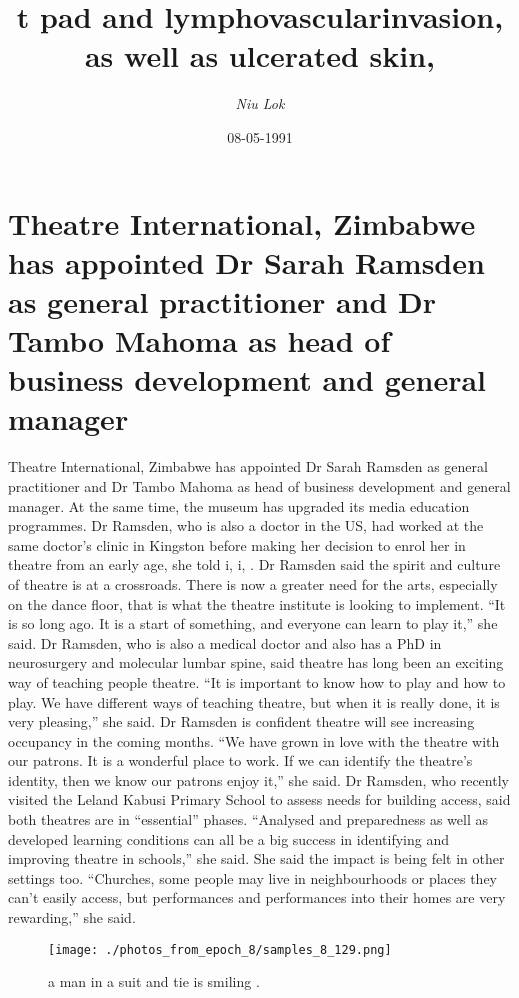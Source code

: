 \documentclass{article}%
\title{t pad and lymphovascularinvasion, as well as ulcerated skin,}%
\author{\textit{Niu Lok}}%
\date{08-05-1991}%
\begin{document}
%
\normalsize%
\maketitle%
\section{Theatre International, Zimbabwe has appointed Dr Sarah Ramsden as general practitioner and Dr Tambo Mahoma as head of business development and general manager}%
\label{sec:TheatreInternational,ZimbabwehasappointedDrSarahRamsdenasgeneralpractitionerandDrTamboMahomaasheadofbusinessdevelopmentandgeneralmanager}%
Theatre International, Zimbabwe has appointed Dr Sarah Ramsden as general practitioner and Dr Tambo Mahoma as head of business development and general manager.\newline%
At the same time, the museum has upgraded its media education programmes. Dr Ramsden, who is also a doctor in the US, had worked at the same doctor’s clinic in Kingston before making her decision to enrol her in theatre from an early age, she told i, i,  .\newline%
Dr Ramsden said the spirit and culture of theatre is at a crossroads. There is now a greater need for the arts, especially on the dance floor, that is what the theatre institute is looking to implement.\newline%
“It is so long ago. It is a start of something, and everyone can learn to play it,” she said.\newline%
Dr Ramsden, who is also a medical doctor and also has a PhD in neurosurgery and molecular lumbar spine, said theatre has long been an exciting way of teaching people theatre.\newline%
“It is important to know how to play and how to play. We have different ways of teaching theatre, but when it is really done, it is very pleasing,” she said.\newline%
Dr Ramsden is confident theatre will see increasing occupancy in the coming months.\newline%
“We have grown in love with the theatre with our patrons. It is a wonderful place to work. If we can identify the theatre’s identity, then we know our patrons enjoy it,” she said.\newline%
Dr Ramsden, who recently visited the Leland Kabusi Primary School to assess needs for building access, said both theatres are in “essential” phases.\newline%
“Analysed and preparedness as well as developed learning conditions can all be a big success in identifying and improving theatre in schools,” she said.\newline%
She said the impact is being felt in other settings too.\newline%
“Churches, some people may live in neighbourhoods or places they can’t easily access, but performances and performances into their homes are very rewarding,” she said.\newline%

%


\begin{figure}[h!]%
\centering%
\texttt{[image: ./photos\_from\_epoch\_8/samples\_8\_129.png]}%
\caption{a man in a suit and tie is smiling .}%
\end{figure}

%
\end{document}
